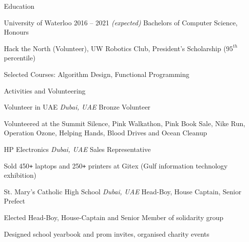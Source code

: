 \documentclass{resume} %
\begin{document}

\begin{rSection}{Education}
  \begin{rSubsection}{University of Waterloo}
		     {2016 -- 2021 \em (expected)}
		     {Bachelors of Computer Science, Honours}
		     {}
	\item Hack the North (Volunteer), UW Robotics Club,
		President's Scholarship ($95^{th}$ percentile)
	\item Selected Courses: Algorithm Design, Functional Programming
  \end{rSubsection}
\end{rSection} 



\begin{rSection}{Activities and Volunteering}
  \begin{rSubsection}{Volunteer in UAE}
                     {\em Dubai, UAE}
                     {Bronze Volunteer}
                     {}
    \item Volunteered at the Summit Silence, Pink Walkathon, Pink Book Sale, Nike
	    Run, Operation Ozone, Helping Hands, Blood Drives and Ocean Cleanup
  \end{rSubsection}

  \begin{rSubsection}{HP Electronics}
                     {\em Dubai, UAE}
                     {Sales Representative}
                     {}
	     \item Sold 450\texttt{+} laptops and 250\texttt{+} printers at
		     Gitex (Gulf information technology exhibition)
  \end{rSubsection}

  \begin{rSubsection}{St. Mary's Catholic High School}
                     {\em Dubai, UAE}
                     {Head-Boy, House Captain, Senior Prefect}
                     {}
 
  \item Elected Head-Boy, House-Captain and Senior Member of solidarity
	  group
  \item Designed school yearbook and prom invites, organised charity
	  events
	  
  \end{rSubsection}
\end{rSection}
\end{document}
